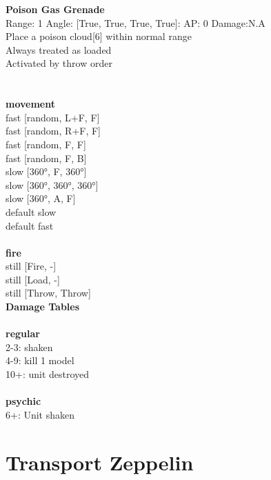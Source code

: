 {\bf Poison Gas Grenade } \\



Range: 1  Angle: [True, True, True, True]: AP: 0 Damage:N.A \\
Place a poison cloud[6] within normal range\\ 
Always treated as loaded\\ 
Activated by throw order\\ 




 
\ \\



\ \\ {\bf movement } \\
fast [random, L+F, F] \\
fast [random, R+F, F] \\
fast [random, F, F] \\
fast [random, F, B] \\
slow [360°, F, 360°] \\
slow [360°, 360°, 360°] \\
slow [360°, A, F] \\
default slow \\
default fast \\
\ \\ {\bf fire } \\
still [Fire, -] \\
still [Load, -] \\
still [Throw, Throw] \\


{\bf Damage Tables} \\
\ \\ {\bf regular } \\
2-3: shaken \\
4-9: kill 1 model \\
10+: unit destroyed \\
\ \\ {\bf psychic } \\
6+: Unit shaken \\










\pagebreak\pagebreak

\section{ Transport Zeppelin }

